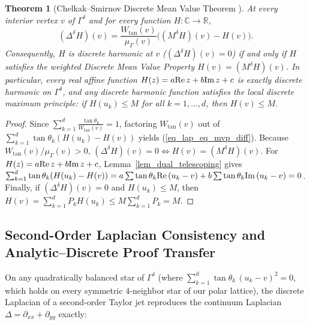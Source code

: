 \documentclass[11pt,reqno]{amsart}
\newtheorem{thm}{Theorem}[section]
\numberwithin{equation}{section}
\newcommand{\R}{\mathbb{R}}
\newcommand{\C}{\mathbb{C}}
\newcommand{\re}{\mbox{\rm Re\,}}
\newcommand{\im}{\mbox{\rm Im\,}}
\begin{document}
\begin{thm}[Chelkak--Smirnov Discrete Mean Value Theorem {\cite[p.~1593]{CS}}] \label{thm_discrete_mvt}
At every interior vertex $v$ of $\varGamma^{\delta}$ and for every function $H : \C \to \R$,
\begin{equation} \label{eq_lap_eq_mvp_diff}
  (\Delta^{\delta} H)(v) = \frac{W_{\tan}(v)}{\mu_{\varGamma}(v)} \bigl((M^{\delta} H)(v) - H(v)\bigr).
\end{equation}
Consequently, $H$ is discrete harmonic at $v$ ($(\Delta^{\delta} H)(v) = 0$) if and only if $H$ satisfies the weighted Discrete Mean Value Property $H(v) = (M^{\delta} H)(v)$. In particular, every real affine function $H(z) = a\re z + b\im z + c$ is exactly discrete harmonic on $\varGamma^{\delta}$, and any discrete harmonic function satisfies the local discrete maximum principle: if $H(u_k) \le M$ for all $k = 1, \dots, d$, then $H(v) \le M$.
\end{thm}
\begin{proof}
Since $\sum_{k=1}^d \frac{\tan\theta_k}{W_{\tan}(v)} = 1$, factoring $W_{\tan}(v)$ out of $\sum_{k=1}^d \tan\theta_k(H(u_k) - H(v))$ yields (\ref{eq_lap_eq_mvp_diff}). Because $W_{\tan}(v) / \mu_{\varGamma}(v) > 0$, $(\Delta^{\delta} H)(v) = 0 \iff H(v) = (M^{\delta} H)(v)$. For $H(z) = a\re z + b\im z + c$, Lemma~\ref{lem_dual_telescoping} gives $\sum_{k=1}^d \tan\theta_k(H(u_k) - H(v)) = a\sum \tan\theta_k\re(u_k - v) + b\sum \tan\theta_k\im(u_k - v) = 0$. Finally, if $(\Delta^{\delta} H)(v) = 0$ and $H(u_k) \le M$, then $H(v) = \sum_{k=1}^d P_k H(u_k) \le M \sum_{k=1}^d P_k = M$.
\end{proof}

\subsection{Second-Order Laplacian Consistency and Analytic--Discrete Proof Transfer}

On any quadratically balanced star of $\varGamma^{\delta}$ (where $\sum_{k=1}^d \tan\theta_k\,(u_k - v)^2 = 0$, which holds on every symmetric $4$-neighbor star of our polar lattice), the discrete Laplacian of a second-order Taylor jet reproduces the continuum Laplacian $\Delta = \partial_{xx} + \partial_{yy}$ exactly:
\end{document}
